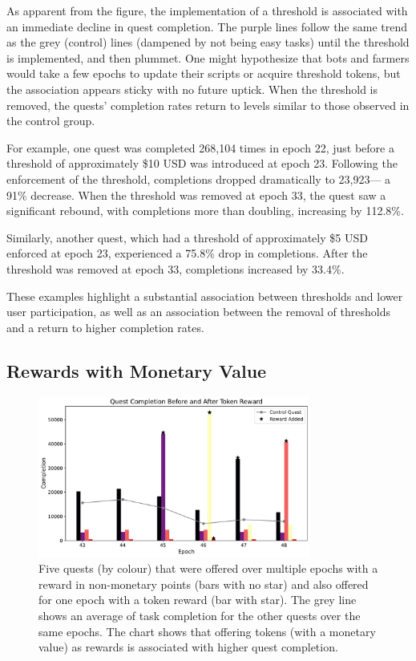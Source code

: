 As apparent from the figure, the implementation of a threshold is associated with an immediate decline in quest completion. The purple lines follow the same trend as the grey (control) lines (dampened by not being easy tasks) until the threshold is implemented, and then plummet. One might hypothesize that bots and farmers would take a few epochs to update their scripts or acquire threshold tokens, but the association appears sticky with no future uptick. When the threshold is removed, the quests' completion rates return to levels similar to those observed in the control group.

For example, one quest was completed 268,104 times in epoch 22, just before a threshold of approximately \$10 USD was introduced at epoch 23. Following the enforcement of the threshold, completions dropped dramatically to 23,923— a 91\% decrease. When the threshold was removed at epoch 33, the quest saw a significant rebound, with completions more than doubling, increasing by 112.8\%.

Similarly, another quest, which had a threshold of approximately \$5 USD enforced at epoch 23, experienced a 75.8\% drop in completions. After the threshold was removed at epoch 33, completions increased by 33.4\%. 

These examples highlight a substantial association between thresholds and lower user participation, as well as an association between the removal of thresholds and a return to higher completion rates.



\subsection{Rewards with Monetary Value}
\label{sec:rewards}

\begin{figure}[t]
    \centering
    \includegraphics[width=0.8\textwidth]{figures/tokens.pdf}
    \caption{Five quests (by colour) that were offered over multiple epochs with a reward in non-monetary points (bars with no star) and also offered for one epoch with a token reward (bar with star). The grey line shows an average of task completion for the other quests over the same epochs. The chart shows that offering tokens (with a monetary value) as rewards is associated with higher quest completion. \label{fig:tokens}}
\end{figure}


